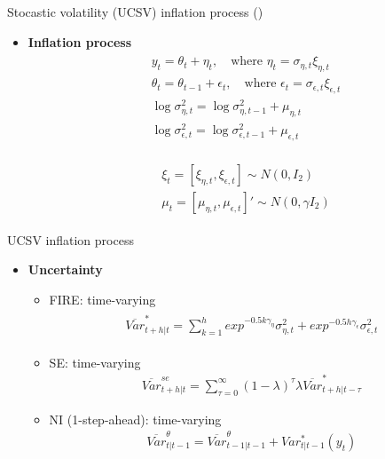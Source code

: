 \documentclass{beamer}
\begin{document}
\begin{frame}{Stocastic volatility (UCSV) inflation process (\citet{stock2007has})}

\begin{itemize}
\item \textbf{Inflation process}
\begin{eqnarray*}
\begin{split}
& y_t = \theta_t + \eta_t,\quad \textrm{where } \eta_t =\sigma_{\eta,t} \xi_{\eta,t} \\
& \theta_t = \theta_{t-1} + \epsilon_t, \quad \textrm{where }  \epsilon_t =\sigma_{\epsilon,t} \xi_{\epsilon,t} \\
& \log\sigma^2_{\eta,t} = \log\sigma^2_{\eta,t-1} + \mu_{\eta,t} \\
& \log\sigma^2_{\epsilon,t} = \log\sigma^2_{\epsilon,t-1} + \mu_{\epsilon,t} 
\end{split}
\end{eqnarray*}

\begin{eqnarray*}
\begin{split}
& \xi_t =[\xi_{\eta,t},\xi_{\epsilon,t}] \sim N(0,I_2) \\
& \mu_{t} = [\mu_{\eta,t},\mu_{\epsilon,t}]' \sim N(0,\gamma I_2) 
\end{split}
\end{eqnarray*}
\end{itemize}

\end{frame}


\begin{frame}{UCSV inflation process}
	
	\begin{itemize}
		\item \textbf{Uncertainty}
		\begin{itemize}
			\item FIRE: time-varying  \begin{eqnarray*}\label{VARRESVPop}
			\begin{split}
			\overline{Var}^*_{t+h|t} = \sum_{k=1}^h exp^{- 0.5k\gamma_{\eta}} \sigma^2_{\eta,t}  +  exp^{- 0.5 h \gamma_{\epsilon}} \sigma^2_{\epsilon,t} 
			\end{split} 
			\end{eqnarray*}
			
			\item SE: time-varying 
			\begin{eqnarray*}
		\overline {Var}^{se}_{t+h|t} = \sum^{\infty}_{\tau=0} (1-\lambda)^\tau\lambda\overline{Var}^*_{t+h|t-\tau} 
			\end{eqnarray*}
			
			\item NI (1-step-ahead): time-varying 
		\begin{eqnarray*}
		\overline{Var}^\theta_{t|t-1} = \overline{Var}^\theta_{t-1|t-1} + Var^*_{t|t-1}(y_t) 
		\end{eqnarray*}
			
		\end{itemize}
	\end{itemize}
	
\end{frame}
\end{document}
